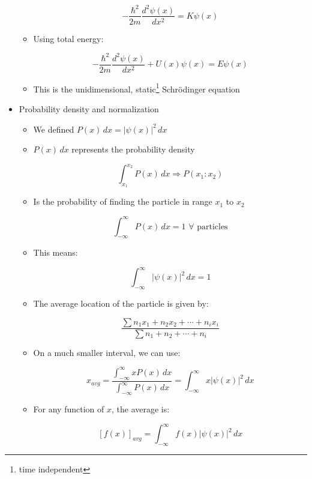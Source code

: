\begin{itemize}
\begin{itemize}
        $$\boxed{-\frac{\hbar^2}{2m}\frac{d^2\psi(x)}{dx^2}=K\psi(x)}$$

      \item Using total energy:

        $$\boxed{-\frac{\hbar^2}{2m}\frac{d^2\psi(x)}{dx^2}+U(x)\psi(x)=E\psi(x)}$$

      \item This is the unidimensional, static\footnote{time independent} Schr\"odinger equation

    \end{itemize}

  \item Probability density and normalization

    \begin{itemize}

      \item We defined $P(x)\,dx=|\psi(x)|^2\,dx$

      \item $P(x)\,dx$ represents the probability density


        $$\int_{x_1}^{x_2} P(x)\,dx\Rightarrow P(x_1:x_2)$$

      \item Is the probability of finding the particle in range $x_1$ to $x_2$

        $$\int_{-\infty}^{\infty}P(x)\,dx=1\,\,\forall\text{ particles}$$

      \item This means:

        $$\boxed{\int_{-\infty}^{\infty} |\psi(x)|^2\,dx = 1}$$

      \item The average location of the particle is given by:

        $$\boxed{\dfrac{\sum n_1x_1+n_2x_2+\cdots+n_ix_i}{\sum n_1+n_2+\cdots+n_i}}$$

      \item On a much smaller interval, we can use:

        $$x_{avg}=\dfrac{\displaystyle \int_{-\infty}^{\infty} xP(x)\,dx}{\displaystyle \int_{-\infty}^{\infty} P(x)\,dx}=\int_{-\infty}^{\infty} x|\psi(x)|^2\,dx$$

      \item For any function of $x$, the average is:

        $$[f(x)]_{avg}=\int_{-\infty}^{\infty}f(x)|\psi(x)|^2\,dx$$

    \end{itemize}


\end{itemize}
